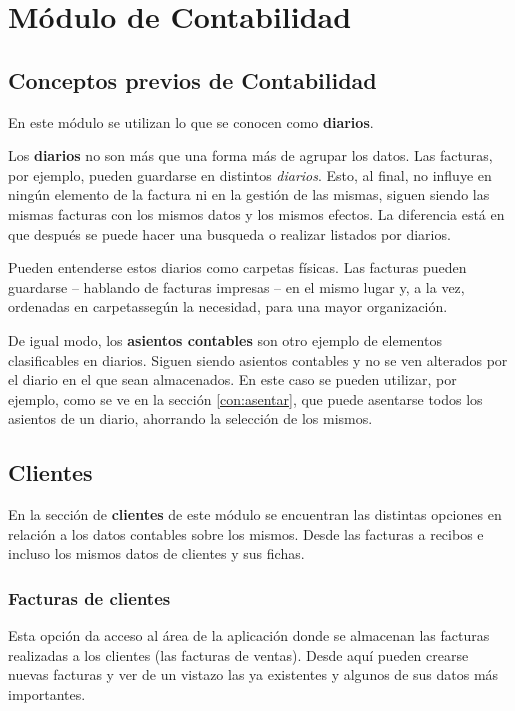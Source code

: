 %
%
%
%

\chapter{Módulo de Contabilidad}

\section{Conceptos previos de Contabilidad}

En este módulo se utilizan lo que se conocen como \textbf{diarios}.

Los \textbf{diarios} no son más que una forma más de agrupar los datos. Las facturas, por ejemplo, pueden guardarse en distintos \emph{diarios}. Esto, al final, no influye en ningún elemento de la factura ni en la gestión de las mismas, siguen siendo las mismas facturas con los mismos datos y los mismos efectos. La diferencia está en que después se puede hacer una busqueda o realizar listados por diarios.

Pueden entenderse estos diarios como carpetas físicas. Las facturas pueden guardarse -- hablando de facturas impresas -- en el mismo lugar y, a la vez, ordenadas en carpetassegún la necesidad, para una mayor organización.

De igual modo, los \textbf{asientos contables} son otro ejemplo de elementos clasificables en diarios. Siguen siendo asientos contables y no se ven alterados por el diario en el que sean almacenados. En este caso se pueden utilizar, por ejemplo, como se ve en la sección \ref{con:asentar}, que puede asentarse todos los asientos de un diario, ahorrando la selección de los mismos.



\section{Clientes}

En la sección de \textbf{clientes} de este módulo se encuentran las distintas opciones en relación a los datos contables sobre los mismos. Desde las facturas a recibos e incluso los mismos datos de clientes y sus fichas.

\subsection{Facturas de clientes}
Esta opción da acceso al área de la aplicación donde se almacenan las facturas realizadas a los clientes (las facturas de ventas). Desde aquí pueden crearse nuevas facturas y ver de un vistazo las ya existentes y algunos de sus datos más importantes.

